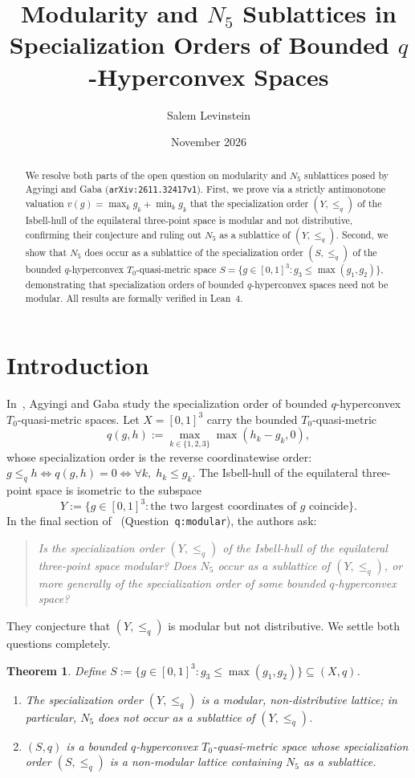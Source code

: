 \documentclass[11pt]{article}
\title{Modularity and $N_5$ Sublattices in Specialization Orders of Bounded $q$-Hyperconvex Spaces}
\author{Salem Levinstein}
\date{November 2026}
\newtheorem{theorem}{Theorem}
\begin{document}
\maketitle

\begin{abstract}
We resolve both parts of the open question on modularity and $N_5$ sublattices
posed by Agyingi and Gaba (\texttt{arXiv:2611.32417v1}). First, we prove via a
strictly antimonotone valuation $v(g) = \max_k g_k + \min_k g_k$ that the
specialization order $(Y, \le_q)$ of the Isbell-hull of the equilateral
three-point space is modular and not distributive, confirming their conjecture
and ruling out $N_5$ as a sublattice of $(Y, \le_q)$. Second, we show that
$N_5$ does occur as a sublattice of the specialization order $(S, \le_q)$ of
the bounded $q$-hyperconvex $T_0$-quasi-metric space
$S = \{g \in [0, 1]^3 : g_3 \le \max(g_1, g_2)\}$, demonstrating that
specialization orders of bounded $q$-hyperconvex spaces need not be modular.
All results are formally verified in Lean~4.
\end{abstract}

\section{Introduction}

In~\cite{AG2026}, Agyingi and Gaba study the specialization order of bounded
$q$-hyperconvex $T_0$-quasi-metric spaces. Let $X = [0, 1]^3$ carry the
bounded $T_0$-quasi-metric
\[
q(g, h) := \max_{k \in \{1, 2, 3\}} \max(h_k - g_k, 0),
\]
whose specialization order is the reverse coordinatewise order:
$g \le_q h \iff q(g, h) = 0 \iff \forall k,\; h_k \le g_k$.
The Isbell-hull of the equilateral three-point space is isometric to the
subspace
\[
Y := \bigl\{g \in [0, 1]^3 : \text{the two largest coordinates of } g \text{ coincide}\bigr\}.
\]
In the final section of~\cite{AG2026} (Question~\texttt{q:modular}), the
authors ask:
\begin{quote}\itshape
Is the specialization order $(Y, \le_q)$ of the Isbell-hull of the equilateral
three-point space modular? Does $N_5$ occur as a sublattice of $(Y, \le_q)$, or
more generally of the specialization order of some bounded $q$-hyperconvex space?
\end{quote}
They conjecture that $(Y, \le_q)$ is modular but not distributive. We settle
both questions completely.

\begin{theorem}\label{thm:main}
Define $S := \{g \in [0, 1]^3 : g_3 \le \max(g_1, g_2)\} \subseteq (X, q)$.
\begin{enumerate}
  \item The specialization order $(Y, \le_q)$ is a modular, non-distributive
        lattice; in particular, $N_5$ does not occur as a sublattice of $(Y, \le_q)$.
  \item $(S, q)$ is a bounded $q$-hyperconvex $T_0$-quasi-metric space whose
        specialization order $(S, \le_q)$ is a non-modular lattice containing
        $N_5$ as a sublattice.
\end{enumerate}
\end{theorem}
\end{document}
